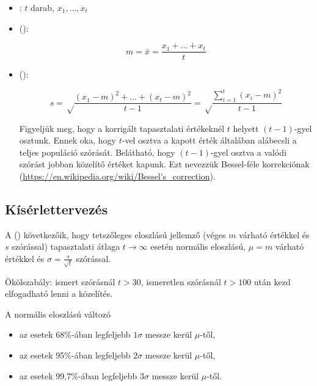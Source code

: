 \begin{definicio}
	\begin{itemize}
		\item {}: $t$ darab, $x_1, \dots, x_t$
		\item {} ():

		$$m = \bar{x} = \frac{x_1 + \dots + x_t}{t}$$

		\item {} ():

		$$s = \sqrt\frac{\left(x_1-m\right)^2 + \dots + \left(x_t-m\right)^2}{t-1} = \sqrt\frac{\sum_{i=1}^{t}\left(x_i - m\right)^2}{t-1}$$

		Figyeljük meg, hogy a korrigált tapasztalati értékeknél $t$ helyett $(t-1)$-gyel osztunk. Ennek oka, hogy $t$-vel osztva a kapott érték általában alábecsli a teljes populáció szórását. Belátható, hogy $(t-1)$-gyel osztva a valódi szórást jobban közelítő értéket kapunk. Ezt nevezzük Bessel-féle korrekciónak (\url{https://en.wikipedia.org/wiki/Bessel's\_correction}).
	\end{itemize}
\end{definicio}

\subsection{Kísérlettervezés}

A  () következőik, hogy tetszőleges eloszlású jellemző (véges $m$ várható értékkel és $s$ szórással) tapasztalati átlaga $t \rightarrow \infty$ esetén normális eloszlású, $\mu = m$ várható értékkel és $\sigma = \frac{s}{\sqrt{t}}$ szórással.

Ökölszabály: ismert szórásnál $t > 30$, ismeretlen szórásnál $t > 100$ után kezd elfogadható lenni a közelítés.

A normális eloszlású változó
\begin{itemize}
	\item az esetek 68\%-ában legfeljebb $1\sigma$ messze kerül $\mu$-től,
	\item az esetek 95\%-ában legfeljebb $2\sigma$ messze kerül $\mu$-től,
	\item az esetek 99,7\%-ában legfeljebb $3\sigma$ messze kerül $\mu$-től.
\end{itemize}

